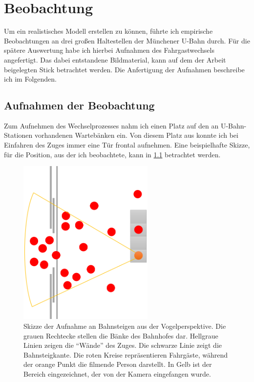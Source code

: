 \chapter{Beobachtung} \label{Beobachtung}
Um ein realistisches Modell erstellen zu können, führte ich empirische Beobachtungen an drei großen Haltestellen der Münchener U-Bahn durch. Für die spätere Auswertung habe ich hierbei Aufnahmen des Fahrgastwechsels angefertigt. Das dabei entstandene Bildmaterial, kann auf dem der Arbeit beigelegten Stick betrachtet werden. Die Anfertigung der Aufnahmen beschreibe ich im Folgenden. 
\section{Aufnahmen der Beobachtung} \label{Aufnahmedetails}
Zum Aufnehmen des Wechselprozesses nahm ich einen Platz auf den an U-Bahn-Stationen vorhandenen Wartebänken ein. Von diesem Platz aus konnte ich bei Einfahren des Zuges immer eine Tür frontal aufnehmen. Eine beispielhafte Skizze, für die Position, aus der ich beobachtete, kann in \figurename \ref{fig:skizzeBeobachtung} betrachtet werden. \\
\begin{figure}[H]
	\centering
		\includegraphics[angle=270, width=0.6\textwidth]{pictures/observation/recording/example_tapping.png}
	\caption{Skizze der Aufnahme an Bahnsteigen aus der Vogelperspektive. Die grauen Rechtecke stellen die Bänke des Bahnhofes dar. Hellgraue Linien zeigen die "`Wände"' des Zuges. Die schwarze Linie zeigt die Bahnsteigkante. Die roten Kreise repräsentieren Fahrgäste, während der orange Punkt die filmende Person darstellt. In Gelb ist der Bereich eingezeichnet, der von der Kamera eingefangen wurde.}
	\label{fig:skizzeBeobachtung}
\end{figure}
